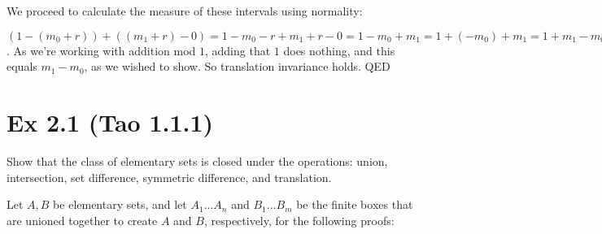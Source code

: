 \documentclass{article}
\begin{document}
We proceed to calculate the measure of these intervals using normality:

$(1 - (m_0 + r)) + ((m_1 + r) - 0) = 1 - m_0 - r + m_1 + r - 0 = 1 - m_0 + m_1 = 1 + (-m_0) + m_1 = 1 + m_1 - m_0$. As we're working with addition mod $1$, adding that $1$ does nothing, and this equals $m_1 - m_0$, as we wished to show. So translation invariance holds. QED

\section{Ex 2.1 (Tao 1.1.1)}
 Show that the class of elementary sets is closed under the operations: union, intersection, set difference, symmetric difference, and translation.

Let $A, B$ be elementary sets, and let $A_1 ... A_n$ and $B_1 ... B_m$ be the finite boxes that are unioned together to create $A$ and $B$, respectively, for the following proofs:
\end{document}
